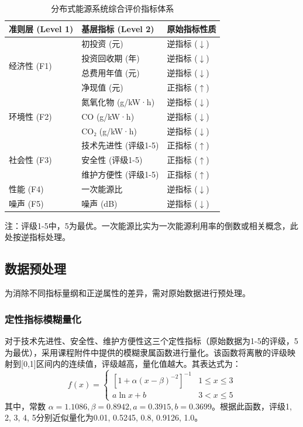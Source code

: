 \documentclass[12pt]{ctexart}
\begin{document}
\begin{table}[H]
  \centering
  \caption{分布式能源系统综合评价指标体系}
  \label{tab:indicators}
  \begin{tabular}{lll}
    \toprule
    准则层 (Level 1) & 基层指标 (Level 2) & 原始指标性质 \\
    \midrule
    \multirow{4}{*}{经济性 (F1)} 
        & 初投资 (元) & 逆指标 (\(\downarrow\)) \\
        & 投资回收期 (年) & 逆指标 (\(\downarrow\)) \\
        & 总费用年值 (元) & 逆指标 (\(\downarrow\)) \\
        & 净现值 (元) & 正指标 (\(\uparrow\)) \\
    \midrule
    \multirow{3}{*}{环境性 (F2)} 
        & 氮氧化物 (g/kW·h) & 逆指标 (\(\downarrow\)) \\
        & CO (g/kW·h) & 逆指标 (\(\downarrow\)) \\
        & CO₂ (g/kW·h) & 逆指标 (\(\downarrow\)) \\
    \midrule
    \multirow{3}{*}{社会性 (F3)} 
        & 技术先进性 (评级1-5) & 正指标 (\(\uparrow\)) \\
        & 安全性 (评级1-5) & 正指标 (\(\uparrow\)) \\
        & 维护方便性 (评级1-5) & 正指标 (\(\uparrow\)) \\
    \midrule
    性能 (F4) & 一次能源比 & 逆指标 (\(\downarrow\)) \\
    \midrule
    噪声 (F5) & 噪声 (dB) & 逆指标 (\(\downarrow\)) \\
    \bottomrule
  \end{tabular}
\end{table}
注：评级1-5中，5为最优。一次能源比实为一次能源利用率的倒数或相关概念，此处按逆指标处理。

\subsection{数据预处理}
为消除不同指标量纲和正逆属性的差异，需对原始数据进行预处理。

\subsubsection{定性指标模糊量化}
对于技术先进性、安全性、维护方便性这三个定性指标（原始数据为1-5的评级，5为最优），采用课程附件中提供的模糊隶属函数进行量化。该函数将离散的评级映射到[0,1]区间内的连续值，评级越高，量化值越大。其表达式为：
\[
f(x) = 
\begin{cases} 
[1 + \alpha(x-\beta)^{-2}]^{-1} & 1 \le x \le 3 \\
a \ln x + b & 3 < x \le 5 
\end{cases}
\]
其中，常数 \(\alpha=1.1086, \beta=0.8942, a=0.3915, b=0.3699\)。根据此函数，评级1, 2, 3, 4, 5分别近似量化为0.01, 0.5245, 0.8, 0.9126, 1.0。
\end{document}

